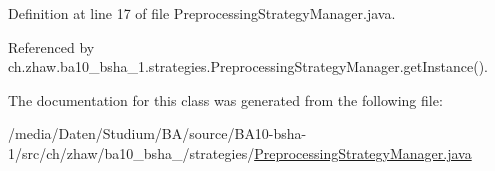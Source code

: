 Definition at line 17 of file PreprocessingStrategyManager.java.

Referenced by ch.zhaw.ba10\_\-bsha\_\-1.strategies.PreprocessingStrategyManager.getInstance().

The documentation for this class was generated from the following file:\begin{DoxyCompactItemize}
\item 
/media/Daten/Studium/BA/source/BA10-\/bsha-\/1/src/ch/zhaw/ba10\_\-bsha\_/strategies/\hyperlink{PreprocessingStrategyManager_8java}{PreprocessingStrategyManager.java}\end{DoxyCompactItemize}

